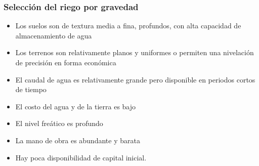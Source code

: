 \subsubsection{Selección del riego por gravedad}
\begin{itemize}
    \item Los suelos son de textura media a fina, profundos, con alta capacidad de almacenamiento de agua
    \item Los terrenos son relativamente planos y uniformes o permiten una nivelación de precisión en forma económica
    \item El caudal de agua es relativamente grande pero disponible en periodos cortos de tiempo
    \item El costo del agua y de la tierra es bajo
    \item El nivel freático es profundo
    \item La mano de obra es abundante y barata
    \item Hay poca disponibilidad de capital inicial.
\end{itemize}
